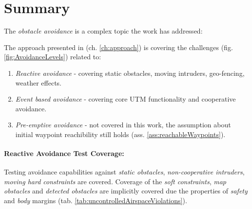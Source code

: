 \setcounter{chapter}{8}
\setcounter{section}{0}
\setcounter{subsection}{0}

\section{Summary}\label{s:conclusionSummary}
\noindent The \emph{obstacle avoidance} is a complex topic the work has addressed:


\noindent The approach presented in (ch. \ref{ch:approach}) is covering the challenges (fig. \ref{fig:AvoidanceLevels}) related to:
\begin{enumerate}
    \item \emph{Reactive avoidance} - covering static obstacles, moving intruders, geo-fencing, weather effects.
    
    \item \emph{Event based avoidance} - covering core UTM functionality and cooperative avoidance.
    
    \item \emph{Pre-emptive avoidance} - not covered in this work, the assumption about initial waypoint reachibility still holds (ass. \ref{ass:reachableWaypoints}).
\end{enumerate}

\paragraph{Reactive Avoidance Test Coverage:} Testing avoidance capabilities against \emph{static obstacles}, \emph{non-cooperative intruders}, \emph{moving hard constraints} are covered. Coverage of the \emph{soft constraints}, \emph{map obstacles} and \emph{detected obstacles} are implicitly covered due the properties of \emph{safety} and \emph{body} margins (tab. \ref{tab:uncontrolledAirspaceViolations}).
    
